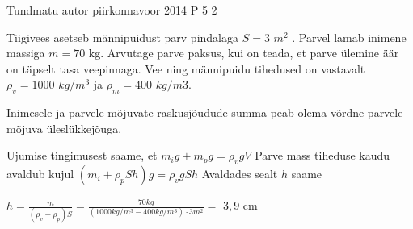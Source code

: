 {Tundmatu autor} %
{piirkonnavoor} %
{2014} %
{P 5} %
{2} %
{
\ifStatement
Tiigivees asetseb männipuidust parv pindalaga $S = 3$ $m^2$ . Parvel lamab inimene massiga $m = 70$ kg. Arvutage parve paksus, kui on teada, et parve ülemine äär on täpselt tasa veepinnaga. Vee ning männipuidu tihedused on vastavalt $\rho_v = 1000$ $kg/m^3$ ja $\rho_m = 400$ $kg/m3$.
\fi

\ifHint
Inimesele ja parvele mõjuvate raskusjõudude summa peab olema võrdne parvele mõjuva üleslükkejõuga.
\fi

\ifSolution
Ujumise tingimusest saame, et $m_i g + m_p g = \rho_v g V$
\newline
Parve mass tiheduse kaudu avaldub kujul $(m_i + \rho_p Sh)g = \rho_v g Sh$
\newline
Avaldades sealt $h$ saame
\begin{center}
$h= \frac{m}{(\rho_v -  \rho_p)S} = \frac{70kg}{(1000 kg/m^3 - 400 kg/m^3) \cdot 3 m^2} =$ $3,9$ cm
\end{center}
\fi
}